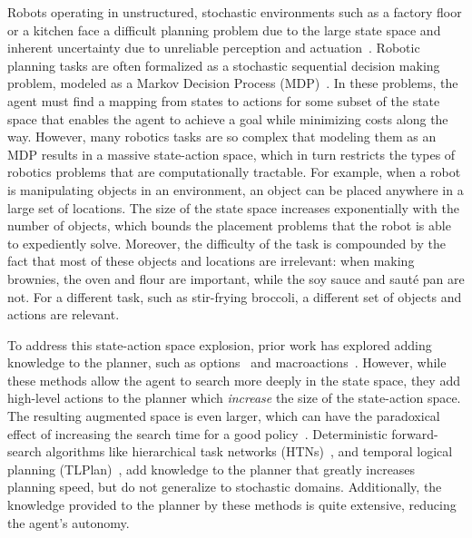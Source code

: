 \documentclass[letterpaper]{article}
\begin{document}
Robots operating in unstructured, stochastic environments such as a
factory floor or a kitchen face a difficult planning problem due to
the large state space and inherent uncertainty due to unreliable
perception and actuation~\citep{bollini12,knepper13}.  Robotic
planning tasks are often formalized as a stochastic sequential
decision making problem, modeled as a Markov Decision Process
(MDP)~\citep{thrun2008probabilistic}. In these problems, the agent
must find a mapping from states to actions for some subset of the
state space that enables the agent to achieve a goal while minimizing
costs along the way. However, many robotics tasks are so complex that
modeling them as an MDP results in a massive state-action space, which
in turn restricts the types of robotics problems that are
computationally tractable. For example, when a robot is manipulating
objects in an environment, an object can be placed anywhere in a large
set of locations. The size of the state space increases exponentially
with the number of objects, which bounds the placement problems that
the robot is able to expediently solve.  Moreover, the difficulty of the task is compounded
by the fact that most of these objects and locations are irrelevant: when making brownies,
the oven and flour are important, while the soy sauce and saut\'{e}
pan are not.  For a different task, such as stir-frying broccoli, a
different set of objects and actions are relevant.

To address this state-action space explosion, prior work has explored
adding knowledge to the planner, such as options~\cite{sutton99} and
macroactions~\cite{Botea:2005kx,Newton:2005vn}.  However, while these
methods allow the agent to search more deeply in the state space, they
add high-level actions to the planner which {\em increase} the size of
the state-action space.  The resulting augmented space is even larger,
which can have the paradoxical effect of increasing the search time
for a good policy~\cite{Jong:2008zr}.  
Deterministic forward-search algorithms like hierarchical task
networks (HTNs)~\citep{Nau:1999:SSH:1624312.1624357}, and temporal
logical planning (TLPlan)~\citep{Bacchus95usingtemporal,Bacchus99usingtemporal},
add knowledge to the planner that greatly increases planning speed, but do
not generalize to stochastic domains. Additionally, the knowledge
provided to the planner by these methods is quite extensive, reducing the
agent's autonomy. 
\end{document}
